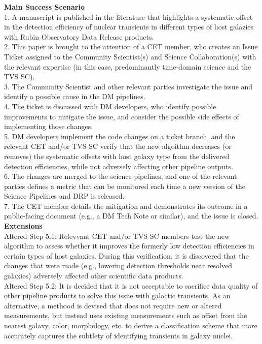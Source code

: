 {\bf Main Success Scenario} \\
1. A manuscript is published in the literature that highlights a systematic offset in the detection efficiency of nuclear transients in different types of host galazies with Rubin Observatory Data Release products. \\
2. This paper is brought to the attention of a CET member, who creates an Issue Ticket assigned to the Community Scientist(s) and Science Collaboration(s) with the relevant expertise (in this case, predominantly time-domain science and the TVS SC). \\
3. The Community Scientist and other relevant parties investigate the issue and identify a possible cause in the DM pipelines. \\
4. The ticket is discussed with DM developers, who identify possible improvements to mitigate the issue, and consider the possible side effects of implementing those changes. \\
5. DM developers implement the code changes on a ticket branch, and the relevant CET and/or TVS-SC verify that the new algoithm decreases (or removes) the systematic offsets with host galaxy type from the delivered detection efficiencies, while not adversely affecting other pipeline outputs. \\
6. The changes are merged to the science pipelines, and one of the relevant parties defines a metric that can be monitored each time a new version of the Science Pipelines and DRP is released. \\
7.  The CET member details the mitigation and demonstrates its outcome in a public-facing document (e.g., a DM Tech Note or similar), and the issue is closed. \\

{\bf Extensions} \\
Altered Step 5.1: Relevvant CET and/or TVS-SC members test the new algorithm to assess whether it improves the formerly low detection efficiencies in certain types of host galaxies.  During this verification, it is discovered that the changes that were made (e.g., lowering detection thresholds near resolved galaxies) adversely affected other scientific data products. \\
Altered Step 5.2: It is decided that it is not acceptable to sacrifice data quality of other pipeline products to solve this issue with galactic transients.  As an alternative, a methood is devised that does not require new or altered measurements, but instead uses existing measurements such as offset from the nearest galaxy, color, morphology, etc. to derive a classification scheme that more accurately captures the subtlety of identifying transients in galaxy nuclei. \\

